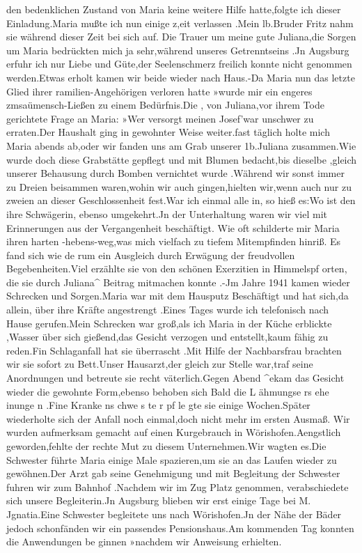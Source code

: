 \documentclass[a4paper,11pt]{article}
\begin{document}
   den bedenklichen Zustand von Maria keine weitere Hilfe hatte,folgte ich dieser Einladung.Maria mußte ich nun einige z,eit verlassen .Mein lb.Bruder Fritz nahm sie während dieser Zeit bei sich auf. Die Trauer um meine gute Juliana,die Sorgen um Maria bedrückten mich ja sehr,während unseres Getrenntseins .Jn Augsburg erfuhr ich nur Liebe und Güte,der Seelenschmerz freilich konnte nicht genommen werden.Etwas erholt kamen wir beide wieder nach Haus.-Da Maria nun das letzte Glied ihrer ramilien-Angehörigen verloren hatte »wurde mir ein engeres zmsaümensch-Ließen zu einem Bedürfnis.Die , von Juliana,vor ihrem Tode gerichtete Frage an Maria: »Wer versorgt meinen Josef'war unschwer zu erraten.Der Haushalt ging in gewohnter Weise weiter.fast täglich holte mich Maria abends ab,oder wir fanden uns am Grab unserer 1b.Juliana zusammen.Wie wurde doch diese Grabstätte gepflegt und mit Blumen bedacht,bis dieselbe ,gleich unserer Behausung durch Bomben vernichtet wurde .Während wir sonst immer zu Dreien beisammen waren,wohin wir auch gingen,hielten wir,wenn auch nur zu zweien an dieser Geschlossenheit fest.War ich einmal alle in, so hieß es:Wo ist den ihre Schwägerin, ebenso umgekehrt.Jn der Unterhaltung waren wir viel mit Erinnerungen aus der Vergangenheit beschäftigt. Wie oft schilderte mir Maria ihren harten -hebens-weg,was mich vielfach zu tiefem Mitempfinden hinriß. Es fand sich wie de rum ein Ausgleich durch Erwägung der freudvollen Begebenheiten.Viel erzählte sie von den schönen Exerzitien in Himmelspf orten, die sie durch Juliana^ Beitrag mitmachen konnte .-Jm Jahre 1941 kamen wieder Schrecken und Sorgen.Maria war mit dem Hausputz Beschäftigt und hat sich,da allein, über ihre Kräfte angestrengt .Eines Tages wurde ich telefonisch nach Hause gerufen.Mein Schrecken war groß,als ich Maria in der Küche erblickte ,Wasser über sich gießend,das Gesicht verzogen und entstellt,kaum fähig zu reden.Fin Schlaganfall hat sie überrascht .Mit Hilfe der Nachbarsfrau brachten wir sie sofort zu Bett.Unser Hausarzt,der gleich zur Stelle war,traf seine Anordnungen und betreute sie recht väterlich.Gegen Abend ^ekam das Gesicht wieder die gewohnte Form,ebenso behoben sich Bald die L ähmungse rs ehe inunge n .Fine Kranke ns chwe s te r pf le gte sie einige Wochen.Später wiederholte sich der Anfall noch einmal,doch nicht mehr im ersten Ausmaß. Wir wurden aufmerksam gemacht auf einen Kurgebrauch in Wörishofen.Aengstlich geworden,fehlte der rechte Mut zu diesem Unternehmen.Wir wagten es.Die Schwester führte Maria einige Male spazieren,um sie an das Laufen wieder zu gewöhnen.Der Arzt gab seine Genehmigung und mit Begleitung der Schwester fuhren wir zum Bahnhof .Nachdem wir im Zug Platz genommen, verabschiedete sich unsere Begleiterin.Jn Augsburg blieben wir erst einige Tage bei M. Jgnatia.Eine Schwester begleitete uns nach Wörishofen.Jn der Nähe der Bäder jedoch schonfänden wir ein passendes Pensionshaus.Am kommenden Tag konnten die Anwendungen be ginnen »nachdem wir Anweisung erhielten.
\end{document}
